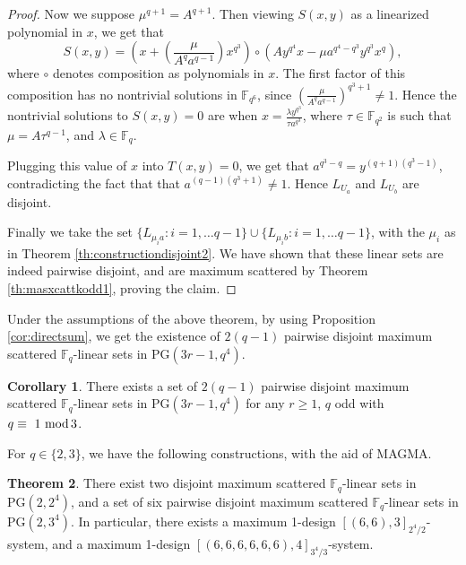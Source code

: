 \documentclass[11pt]{amsart}
\theoremstyle{definition}
\newtheorem{theorem}{Theorem}[section]
\newtheorem{corollary}[theorem]{Corollary}
\newcommand{\F}{{\mathbb F}}
\newcommand{\fq}{{\mathbb F}_{q}}
\newcommand{\Fq}{{\mathbb F}_{q}}
\renewcommand{\mod}{\hbox{{\rm mod}\,}}
\newcommand{\PG}{\mathrm{PG}}
\begin{document}
\begin{proof}
Now we suppose $\mu^{q+1}=A^{q+1}$. Then viewing $S(x,y)$ as a linearized polynomial in $x$, we get that
\[
S(x,y) = \left(x+\left(\frac{\mu}{A^q a^{q-1}}\right)x^{q^3}\right) \circ (Ay^{q^4}x-\mu a^{q^4-q^3} y^{q^3}x^q),
\]
where $\circ$ denotes composition as polynomials in $x$. The first factor of this composition has no nontrivial solutions in $\F_{q^6}$, since $\left(\frac{\mu}{A^q a^{q-1}}\right)^{q^3+1}\ne 1$. Hence the nontrivial solutions to $S(x,y)=0$ are when $x=\frac{\lambda y^{q^3}}{\tau a^{q^3}}$, where $\tau\in \F_{q^2}$ is such that $\mu=A\tau^{q-1}$, and $\lambda\in \Fq$. 

Plugging this value of $x$ into $T(x,y)=0$, we get that $a^{q^3-q}=y^{(q+1)(q^3-1)}$, contradicting the fact that that $a^{(q-1)(q^3+1)}\ne 1$. Hence $L_{U_a}$ and $L_{U_b}$ are disjoint.




Finally we take the set $\{L_{\mu_i a}:i=1,\ldots q-1\}\cup \{L_{\mu_i b}:i=1,\ldots q-1\}$,
with the $\mu_i$ as in Theorem \ref{th:constructiondisjoint2}. We have shown that these linear sets are indeed pairwise disjoint, and are maximum scattered by Theorem \ref{th:masxcattkodd1}, proving the claim.
\end{proof}


Under the assumptions of the above theorem, by using Proposition \ref{cor:directsum}, we get the existence of $2(q-1)$ pairwise disjoint maximum scattered $\F_q$-linear sets in $\PG(3r-1,q^4)$.
\begin{corollary} \label{cor:maximum1designt>q-1particular}
     There exists a set of $2(q-1)$ pairwise disjoint maximum scattered $\F_q$-linear sets in $\PG(3r-1,q^4)$ for any $r\geq 1$, $q$ odd with $q\equiv ~1~ \mod 3$.
\end{corollary}



For $q \in \{2,3\}$, we have the following constructions, with the aid of MAGMA.

\begin{theorem} %
\label{thm:sporadic1des}
    There exist two disjoint maximum scattered $\F_q$-linear sets in $\PG(2,2^4)$, and a set of six pairwise disjoint maximum scattered $\F_q$-linear sets in $\PG(2,3^4)$. In particular, there exists a maximum 1-design $[(6,6),3]_{2^4/2}$-system, and a maximum 1-design $[(6,6,6,6,6,6),4]_{3^4/3}$-system.
\end{theorem}
\end{document}
